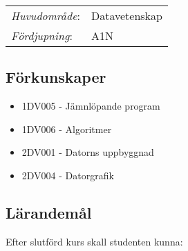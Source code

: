 \begin{tabular}{ll}\emph{Huvudområde}: & Datavetenskap\tabularnewline\emph{Fördjupning}: & A1N\tabularnewline\end{tabular}

\subsection*{Förkunskaper}

\begin{itemize}
\tightlist
\item
  1DV005 - Jämnlöpande program
\item
  1DV006 - Algoritmer
\item
  2DV001 - Datorns uppbyggnad
\item
  2DV004 - Datorgrafik
\end{itemize}

\subsection*{Lärandemål}

Efter slutförd kurs skall studenten kunna:


